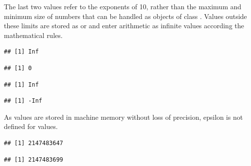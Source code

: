 \documentclass[krantz2]{krantz}\usepackage{knitr}
\begin{document}
\begin{explainbox}
The last two values refer to the exponents of 10, rather than the maximum and minimum size of numbers that can be handled as objects of class . Values outside these limits are stored as  or  and enter arithmetic as infinite values according the mathematical rules.

\begin{knitrout}\footnotesize
{}\color{fgcolor}\begin{kframe}
\begin{alltt}
\end{alltt}
\begin{verbatim}
## [1] Inf
\end{verbatim}
\begin{alltt}
\end{alltt}
\begin{verbatim}
## [1] 0
\end{verbatim}
\begin{alltt}
 \hlopt{+} 
\end{alltt}
\begin{verbatim}
## [1] Inf
\end{verbatim}
\begin{alltt}
\hlopt{-} \hlopt{+} 
\end{alltt}
\begin{verbatim}
## [1] -Inf
\end{verbatim}
\end{kframe}
\end{knitrout}

As  values are stored in machine memory without loss of precision, epsilon is not defined for  values.

\begin{knitrout}\footnotesize
{}\color{fgcolor}\begin{kframe}
\begin{alltt}
\hlopt{$}
\end{alltt}
\begin{verbatim}
## [1] 2147483647
\end{verbatim}
\begin{alltt}
\end{alltt}
\begin{verbatim}
## [1] 2147483699
\end{verbatim}
\end{kframe}
\end{knitrout}


\end{explainbox}
\end{document}

